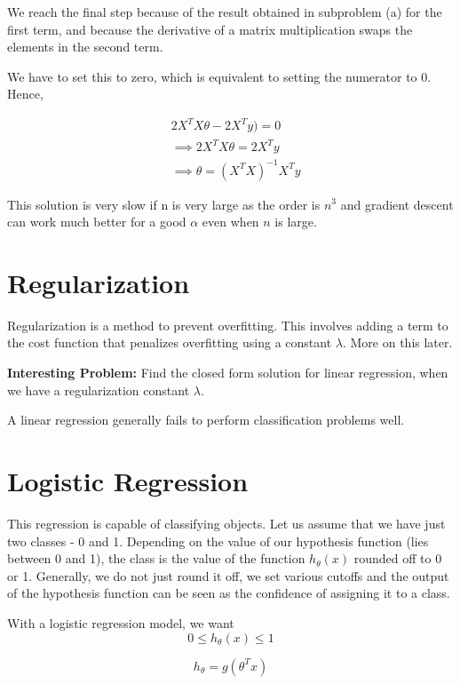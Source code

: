 We reach the final step because of the result obtained in subproblem (a) for the first term, and because the derivative of a matrix multiplication swaps the elements in the second term.

We have to set this to zero, which is equivalent to setting the numerator to 0. Hence,

\begin{equation*}
\begin{split}
    &2X^TX\theta - 2X^Ty) = 0 \\
    &\implies 2X^TX\theta = 2X^Ty \\
    &\implies \theta = (X^TX)^{-1}X^Ty
\end{split}
\end{equation*}

This solution is very slow if n is very large as the order is $n^3$ and gradient descent can work much better for a good $\alpha$ even when $n$ is large.

\section{Regularization}

Regularization is a method to prevent overfitting. This involves adding a term to the cost function that penalizes overfitting using a constant $\lambda$. More on this later. 

\textbf{Interesting Problem:} Find the closed form solution for linear regression, when we have a regularization constant $\lambda$.

A linear regression generally fails to perform classification problems well.

\section{Logistic Regression}

This regression is capable of classifying objects. Let us assume that we have just two classes - 0 and 1. Depending on the value of our hypothesis function (lies between 0 and 1), the class is the value of the function $h_{\theta}(x)$ rounded off to 0 or 1. Generally, we do not just round it off, we set various cutoffs and the output of the hypothesis function can be seen as the confidence of assigning it to a class. 

With a logistic regression model, we want \[ 0 \leq h_{\theta}(x) \leq 1 \]

\begin{equation}
    h_{\theta} = g(\theta^T x)
\end{equation}

